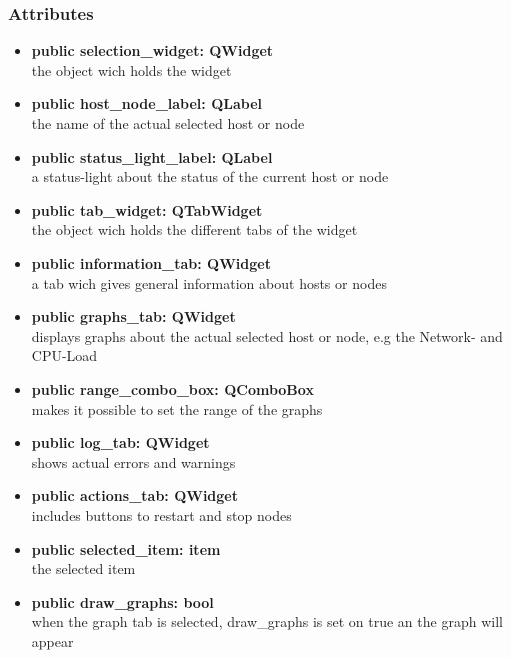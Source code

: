 \subsubsection{Attributes}
\begin{itemize}
  \item \textbf{public selection\_widget: QWidget}\\
  the object wich holds the widget
  \item \textbf{public host\_node\_label: QLabel}\\
  the name of the actual selected host or node
  \item \textbf{public status\_light\_label: QLabel}\\
  a status-light about the status of the current host or node
  \item \textbf{public tab\_widget: QTabWidget}\\
  the object wich holds the different tabs of the widget
  \item \textbf{public information\_tab: QWidget}\\
  a tab wich gives general information about hosts or nodes 
  \item \textbf{public graphs\_tab: QWidget}\\
  displays graphs about the actual selected host or node, e.g the Network- and
  CPU-Load
  \item \textbf{public range\_combo\_box: QComboBox}\\
  makes it possible to set the range of the graphs
  \item \textbf{public log\_tab: QWidget}\\
  shows actual errors and warnings
  \item \textbf{public actions\_tab: QWidget}\\
  includes buttons to restart and stop nodes
  \item \textbf{public selected\_item: item}\\
  the selected item
  \item \textbf{public draw\_graphs: bool}\\
  when the graph tab is selected, draw\_graphs is set on true an the graph will
  appear
\end{itemize}
